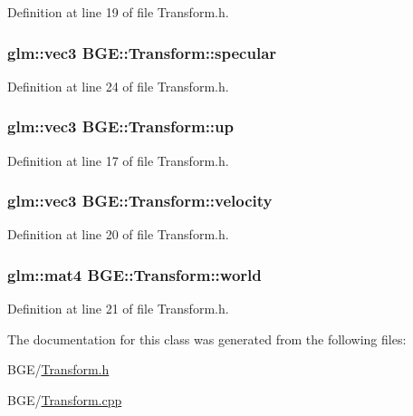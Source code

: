 Definition at line 19 of file Transform.\-h.

\hypertarget{class_b_g_e_1_1_transform_a3b4fe0e657be15a4b9a4e768a5bd35d9}{
\subsubsection[{specular}]{\setlength{\rightskip}{0pt plus 5cm}glm\-::vec3 B\-G\-E\-::\-Transform\-::specular}}\label{class_b_g_e_1_1_transform_a3b4fe0e657be15a4b9a4e768a5bd35d9}


Definition at line 24 of file Transform.\-h.

\hypertarget{class_b_g_e_1_1_transform_ad728f83369928a7409b3c889113651b4}{
\subsubsection[{up}]{\setlength{\rightskip}{0pt plus 5cm}glm\-::vec3 B\-G\-E\-::\-Transform\-::up}}\label{class_b_g_e_1_1_transform_ad728f83369928a7409b3c889113651b4}


Definition at line 17 of file Transform.\-h.

\hypertarget{class_b_g_e_1_1_transform_a202d73d14f1c9c756645cb75acfb72de}{
\subsubsection[{velocity}]{\setlength{\rightskip}{0pt plus 5cm}glm\-::vec3 B\-G\-E\-::\-Transform\-::velocity}}\label{class_b_g_e_1_1_transform_a202d73d14f1c9c756645cb75acfb72de}


Definition at line 20 of file Transform.\-h.

\hypertarget{class_b_g_e_1_1_transform_a1111c3693593c94d9d559dab14070b8d}{
\subsubsection[{world}]{\setlength{\rightskip}{0pt plus 5cm}glm\-::mat4 B\-G\-E\-::\-Transform\-::world}}\label{class_b_g_e_1_1_transform_a1111c3693593c94d9d559dab14070b8d}


Definition at line 21 of file Transform.\-h.



The documentation for this class was generated from the following files\-:\begin{DoxyCompactItemize}
\item 
B\-G\-E/\hyperlink{_transform_8h}{Transform.\-h}\item 
B\-G\-E/\hyperlink{_transform_8cpp}{Transform.\-cpp}\end{DoxyCompactItemize}
